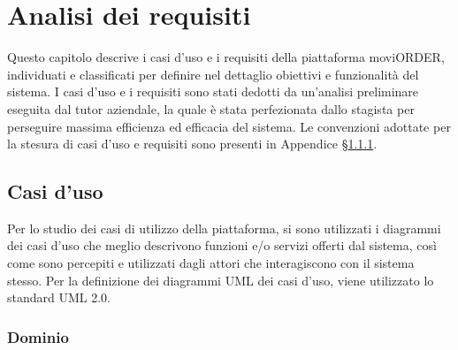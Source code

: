 
\chapter{Analisi dei requisiti}
\label{cap:analisi-requisiti}

Questo capitolo descrive i casi d'uso e i requisiti della piattaforma moviORDER, individuati e classificati per definire nel dettaglio obiettivi e funzionalità del sistema. I casi d'uso e i requisiti sono stati dedotti da un'analisi preliminare eseguita dal tutor aziendale, la quale è stata perfezionata dallo stagista per perseguire massima efficienza ed efficacia del sistema. Le convenzioni adottate per la stesura di casi d'uso e requisiti sono presenti in Appendice §\ref{}.

\section{Casi d'uso}

Per lo studio dei casi di utilizzo della piattaforma, si sono utilizzati i diagrammi dei casi d'uso che meglio descrivono funzioni e/o servizi offerti dal sistema, così come sono percepiti e utilizzati dagli attori che interagiscono con il sistema stesso. Per la definizione dei diagrammi UML dei casi d’uso, viene utilizzato lo standard UML 2.0.

\subsection{Dominio}

